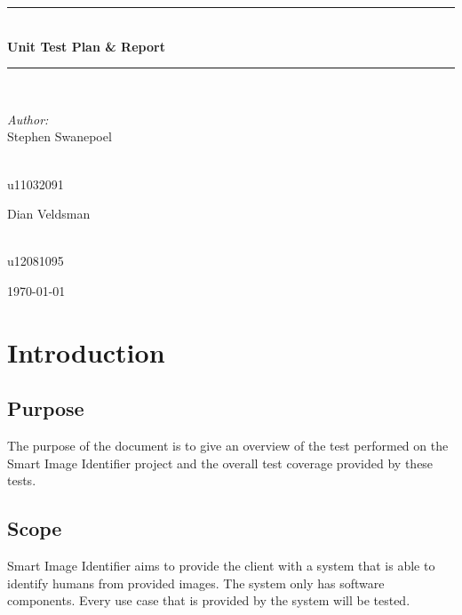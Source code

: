 \documentclass[a4paper,12pt]{report}
\newcommand{\HRule}{\rule{\linewidth}{0.5mm}}
\begin{document}
\begin{titlepage}
\begin{center}
\HRule \\[0.4cm]
{ \huge \bfseries Unit Test Plan \& Report}\\[0.4cm]
\HRule \\[0.4cm]
\begin{minipage}{0.4\textwidth}
\begin{flushleft} \large
\emph{Author:}\\
Stephen {Swanepoel}
\end{flushleft}
\end{minipage}
\begin{minipage}{0.4\textwidth}
\begin{flushright} \large
\emph{} \\
u11032091
\end{flushright}
\end{minipage}
\begin{minipage}{0.4\textwidth}
\begin{flushleft} \large
Dian {Veldsman}
\end{flushleft}
\end{minipage}
\begin{minipage}{0.4\textwidth}
\begin{flushright} \large
\emph{} \\
u12081095
\end{flushright}
\end{minipage}


{\large \today}
\end{center}
\end{titlepage}
\footnotesize
\normalsize

\newpage
\tableofcontents

\renewcommand{\thesection}{\arabic{section}}
\newpage

\section {Introduction}
	\subsection {Purpose}
		The purpose of the document is to give an overview of the test performed on the Smart Image Identifier project and the overall test coverage provided by these tests.
	\subsection {Scope}
		Smart Image Identifier aims to provide the client with a system that is able to identify humans from provided images. The system only has software components.
		Every use case that is provided by the system will be tested.
\end{document}
